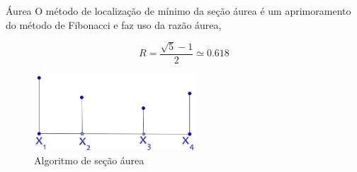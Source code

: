 
\begin{frame}[t]{Áurea}
	O método de localização de mínimo da seção áurea é um aprimoramento do método de Fibonacci e faz uso da razão áurea,
	
	\begin{equation}
		R = \dfrac{\sqrt{5}-1}{2} \simeq 0.618
	\end{equation}
	
	\begin{figure}[h]
		\begin{center}
			\includegraphics[width=6cm]{./aurea_ex.png}   
			\caption{Algoritmo de seção áurea}
			\label{fig:aurea_ex}
		\end{center}
	\end{figure}
\end{frame}